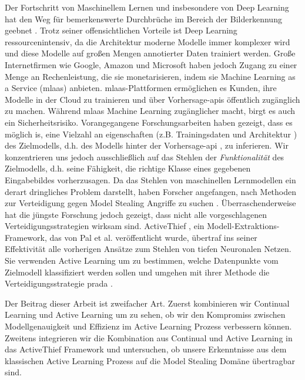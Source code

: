 
\Abstract
Der Fortschritt von Maschinellem Lernen und insbesondere von Deep Learning hat den Weg für bemerkenswerte Durchbrüche im Bereich der Bilderkennung geebnet \cite{he2016deep}
\cite{goodfellow2020generative} \cite{lecun1989backpropagation}. Trotz seiner offensichtlichen Vorteile ist Deep Learning ressourcenintensiv, da die Architektur moderne Modelle 
immer komplexer wird und diese Modelle auf großen Mengen annotierter Daten trainiert werden. Große Internetfirmen wie Google, Amazon und Microsoft haben jedoch Zugang zu einer 
Menge an Rechenleistung, die sie monetarisieren, indem sie Machine Learning as a Service (\gls{mlaas}) anbieten. \gls{mlaas}-Plattformen ermöglichen es Kunden, ihre Modelle in der Cloud
zu trainieren und über Vorhersage-\glspl{api} öffentlich zugänglich zu machen. Während \gls{mlaas} Machine Learning zugänglicher macht, birgt es
auch ein Sicherheitsrisiko. Vorangegangene Forschungsarbeiten haben gezeigt, dass es möglich is, eine Vielzahl an eigenschaften (z.B. Trainingsdaten \cite{shokri2017membership}
und Architektur \cite{oh2019towards}) des Zielmodells, d.h. des Modells hinter der Vorhersage-\gls{api} \cite{tramer2016stealing} \cite{papernot2017practical}, zu inferieren. Wir
konzentrieren uns jedoch ausschließlich auf das Stehlen der \textit{Funktionalität} des Zielmodells, d.h. seine Fähigkeit, die richtige Klasse eines gegebenen Eingabebildes vorherzusagen.
Da das Stehlen von maschinellen Lernmodellen ein derart dringliches Problem darstellt, haben Forscher angefangen, nach Methoden zur Verteidigung gegen Model Stealing Angriffe zu suchen
\cite{orekondy2019prediction} \cite{juuti2019prada}. Überraschenderweise hat die jüngste Forschung jedoch gezeigt, dass nicht alle vorgeschlagenen Verteidigungsstrategien wirksam sind.
ActiveThief \cite{pal2020activethief}, ein Modell-Extraktions-Framework, das von Pal et al. veröffentlicht wurde, übertraf ins seiner Effektivität alle vorherigen Ansätze zum Stehlen
von tiefen Neuronalen Netzen. Sie verwenden Active Learning um zu bestimmen, welche Datenpunkte vom Zielmodell klassifiziert werden sollen und umgehen mit ihrer Methode die
Verteidigungsstrategie \gls{prada} \cite{juuti2019prada}. \par
Der Beitrag dieser Arbeit ist zweifacher Art. Zuerst kombinieren wir Continual Learning und Active Learning um zu sehen, ob wir den Kompromiss zwischen Modellgenauigkeit und Effizienz im 
Active Learning Prozess verbessern können. Zweitens integrieren wir die Kombination aus Continual und Active Learning in das ActiveThief Framework und untersuchen, ob unsere Erkenntnisse aus
dem klassischen Active Learning Prozess auf die Model Stealing Domäne übertragbar sind.
